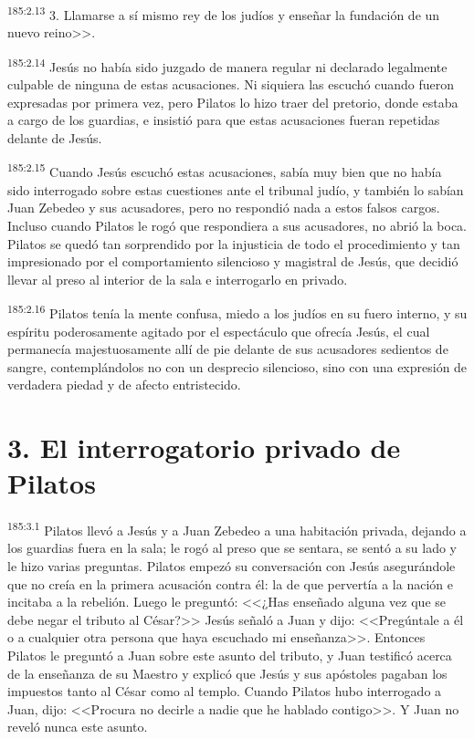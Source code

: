\par 
\textsuperscript{185:2.13} 3. Llamarse a sí mismo rey de los judíos y enseñar la fundación de un nuevo reino>>.

\par 
\textsuperscript{185:2.14} Jesús no había sido juzgado de manera regular ni declarado legalmente culpable de ninguna de estas acusaciones. Ni siquiera las escuchó cuando fueron expresadas por primera vez, pero Pilatos lo hizo traer del pretorio, donde estaba a cargo de los guardias, e insistió para que estas acusaciones fueran repetidas delante de Jesús.

\par 
\textsuperscript{185:2.15} Cuando Jesús escuchó estas acusaciones, sabía muy bien que no había sido interrogado sobre estas cuestiones ante el tribunal judío, y también lo sabían Juan Zebedeo y sus acusadores, pero no respondió nada a estos falsos cargos. Incluso cuando Pilatos le rogó que respondiera a sus acusadores, no abrió la boca. Pilatos se quedó tan sorprendido por la injusticia de todo el procedimiento y tan impresionado por el comportamiento silencioso y magistral de Jesús, que decidió llevar al preso al interior de la sala e interrogarlo en privado.

\par 
\textsuperscript{185:2.16} Pilatos tenía la mente confusa, miedo a los judíos en su fuero interno, y su espíritu poderosamente agitado por el espectáculo que ofrecía Jesús, el cual permanecía majestuosamente allí de pie delante de sus acusadores sedientos de sangre, contemplándolos no con un desprecio silencioso, sino con una expresión de verdadera piedad y de afecto entristecido.

\section*{3. El interrogatorio privado de Pilatos}
\par 
\textsuperscript{185:3.1} Pilatos llevó a Jesús y a Juan Zebedeo a una habitación privada, dejando a los guardias fuera en la sala; le rogó al preso que se sentara, se sentó a su lado y le hizo varias preguntas. Pilatos empezó su conversación con Jesús asegurándole que no creía en la primera acusación contra él: la de que pervertía a la nación e incitaba a la rebelión. Luego le preguntó: <<¿Has enseñado alguna vez que se debe negar el tributo al César?>> Jesús señaló a Juan y dijo: <<Pregúntale a él o a cualquier otra persona que haya escuchado mi enseñanza>>. Entonces Pilatos le preguntó a Juan sobre este asunto del tributo, y Juan testificó acerca de la enseñanza de su Maestro y explicó que Jesús y sus apóstoles pagaban los impuestos tanto al César como al templo. Cuando Pilatos hubo interrogado a Juan, dijo: <<Procura no decirle a nadie que he hablado contigo>>. Y Juan no reveló nunca este asunto.

